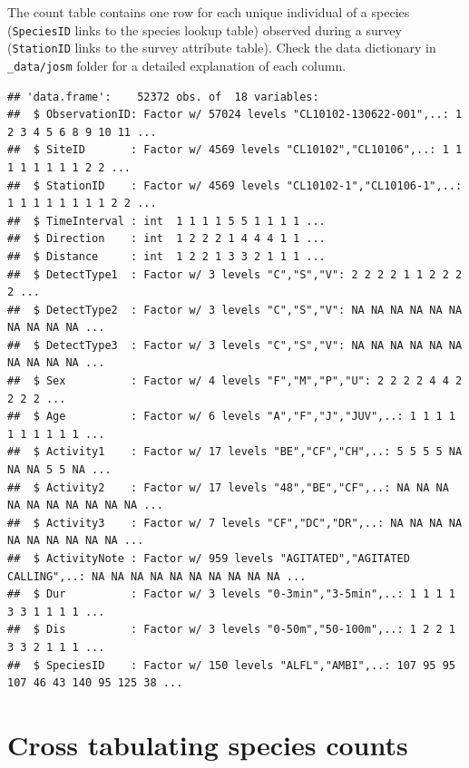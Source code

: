 \documentclass[12pt,]{book}
\newenvironment{Shaded}{\begin{snugshade}}{\end{snugshade}}
\newcommand{\KeywordTok}[1]{\textcolor[rgb]{0.13,0.29,0.53}{\textbf{#1}}}
\newcommand{\NormalTok}[1]{#1}
\newcommand{\OperatorTok}[1]{\textcolor[rgb]{0.81,0.36,0.00}{\textbf{#1}}}
\begin{document}
The count table contains one row for each unique individual
of a species (\texttt{SpeciesID} links to the species lookup table)
observed during a survey (\texttt{StationID} links to the survey attribute table).
Check the data dictionary in \texttt{\_data/josm} folder for a detailed explanation of each column.

\begin{Shaded}
\end{Shaded}

\begin{verbatim}
## 'data.frame':    52372 obs. of  18 variables:
##  $ ObservationID: Factor w/ 57024 levels "CL10102-130622-001",..: 1 2 3 4 5 6 8 9 10 11 ...
##  $ SiteID       : Factor w/ 4569 levels "CL10102","CL10106",..: 1 1 1 1 1 1 1 1 2 2 ...
##  $ StationID    : Factor w/ 4569 levels "CL10102-1","CL10106-1",..: 1 1 1 1 1 1 1 1 2 2 ...
##  $ TimeInterval : int  1 1 1 1 5 5 1 1 1 1 ...
##  $ Direction    : int  1 2 2 2 1 4 4 4 1 1 ...
##  $ Distance     : int  1 2 2 1 3 3 2 1 1 1 ...
##  $ DetectType1  : Factor w/ 3 levels "C","S","V": 2 2 2 2 1 1 2 2 2 2 ...
##  $ DetectType2  : Factor w/ 3 levels "C","S","V": NA NA NA NA NA NA NA NA NA NA ...
##  $ DetectType3  : Factor w/ 3 levels "C","S","V": NA NA NA NA NA NA NA NA NA NA ...
##  $ Sex          : Factor w/ 4 levels "F","M","P","U": 2 2 2 2 4 4 2 2 2 2 ...
##  $ Age          : Factor w/ 6 levels "A","F","J","JUV",..: 1 1 1 1 1 1 1 1 1 1 ...
##  $ Activity1    : Factor w/ 17 levels "BE","CF","CH",..: 5 5 5 5 NA NA NA 5 5 NA ...
##  $ Activity2    : Factor w/ 17 levels "48","BE","CF",..: NA NA NA NA NA NA NA NA NA NA ...
##  $ Activity3    : Factor w/ 7 levels "CF","DC","DR",..: NA NA NA NA NA NA NA NA NA NA ...
##  $ ActivityNote : Factor w/ 959 levels "AGITATED","AGITATED CALLING",..: NA NA NA NA NA NA NA NA NA NA ...
##  $ Dur          : Factor w/ 3 levels "0-3min","3-5min",..: 1 1 1 1 3 3 1 1 1 1 ...
##  $ Dis          : Factor w/ 3 levels "0-50m","50-100m",..: 1 2 2 1 3 3 2 1 1 1 ...
##  $ SpeciesID    : Factor w/ 150 levels "ALFL","AMBI",..: 107 95 95 107 46 43 140 95 125 38 ...
\end{verbatim}

\hypertarget{cross-tabulating-species-counts}{%
\section{Cross tabulating species counts}\label{cross-tabulating-species-counts}}
\end{document}
